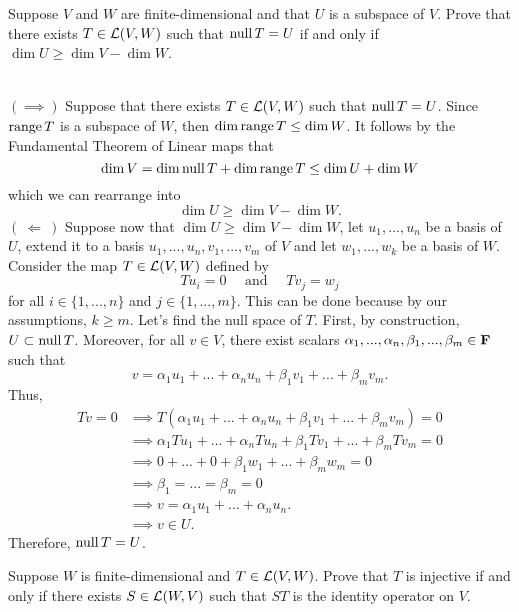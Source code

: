 \begin{exercise}
    Suppose $V$ and $W$ are finite-dimensional and that $U$ is a subspace of $V$. Prove that there exists $T \in \mathcal{L}(V,W)$ such that $\operatorname{\text{null}} T = U$ if and only if $\dim U \geq \dim V - \dim W$. \\
\end{exercise}

\begin{solution}
    \\ $(\implies)$ Suppose that there exists $T \in \mathcal{L}(V,W)$ such that $\operatorname{\text{null}} T = U$. Since $\operatorname{\text{range}} T$ is a subspace of $W$, then $\dim \operatorname{\text{range}} T \leq \dim W$. It follows by the Fundamental Theorem of Linear maps that
    $$\dim V = \dim \operatorname{\text{null}} T + \dim \operatorname{\text{range}} T \leq \dim U + \dim W$$
    which we can rearrange into 
    $$\dim U \geq \dim V - \dim W.$$
    $( \ \Longleftarrow \ )$ Suppose now that $\dim U \geq \dim V - \dim W$, let $u_1, ..., u_n$ be a basis of $U$, extend it to a basis $u_1, ..., u_n, v_1, ..., v_m$ of $V$ and let $w_1, ..., w_k$ be a basis of $W$. Consider the map $T \in \mathcal{L}(V,W)$ defined by
    $$Tu_i = 0 \quad \text{ and } \quad Tv_j = w_j$$
    for all $i \in \{1, ..., n\}$ and $j \in \{1, ..., m\}$. This can be done because by our assumptions, $k \geq m$. Let's find the null space of $T$. First, by construction, $U \subset \operatorname{\text{null}} T$. Moreover, for all $v \in V$, there exist scalars $\alpha_1, ..., \alpha_n, \beta_1, ..., \beta_m \in \mathbf{F}$ such that
    $$v = \alpha_1u_1 + ... + \alpha_n u_n + \beta_1 v_1 + ... + \beta_m v_m.$$
    Thus, 
    \begin{align*}
        Tv = 0 &\implies T(\alpha_1u_1 + ... + \alpha_n u_n + \beta_1 v_1 + ... + \beta_m v_m) = 0\\
        &\implies \alpha_1Tu_1 + ... + \alpha_n Tu_n + \beta_1 Tv_1 + ... + \beta_m Tv_m = 0 \\
        &\implies 0 + ... + 0 + \beta_1 w_1 + ... + \beta_m w_m = 0 \\
        &\implies \beta_1 = ... = \beta_m = 0 \\
        &\implies v = \alpha_1u_1 + ... + \alpha_n u_n. \\
        &\implies v \in U.
    \end{align*}
    Therefore, $\operatorname{\text{null}} T = U$.\\
\end{solution}

\begin{exercise}
    Suppose $W$ is finite-dimensional and $T \in \mathcal{L}(V,W)$. Prove that $T$ is injective if and only if there exists $S \in \mathcal{L}(W,V)$ such that $ST$ is the identity operator on $V$. \\
\end{exercise}

